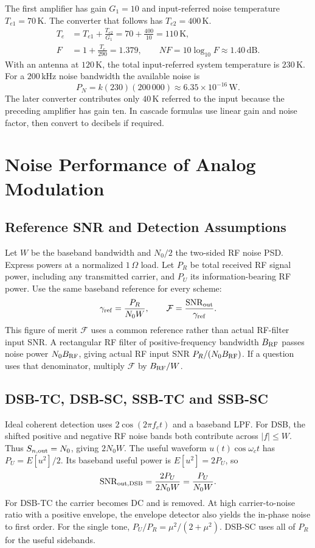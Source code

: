 \documentclass[12pt,a4paper]{article}
\begin{document}
\begin{tcolorbox}[examplebox, title={Calculate a Two-Stage Receiver Noise Temperature}]
The first amplifier has gain $G_1=10$ and input-referred noise temperature $T_{e1}=70\,\mathrm K$. The converter that follows has $T_{e2}=400\,\mathrm K$.
\[
\begin{aligned}
 T_e &= T_{e1}+\frac{T_{e2}}{G_1}
      =70+\frac{400}{10}=110\,\mathrm K,\\
 F&=1+\frac{T_e}{290}=1.379,\qquad
 NF=10\log_{10}F\approx1.40\,\mathrm{dB}.
\end{aligned}
\]
With an antenna at $120\,\mathrm K$, the total input-referred system temperature is $230\,\mathrm K$. For a $200\,\mathrm{kHz}$ noise bandwidth the available noise is
\[
 P_N=k(230)(200\,000)\approx6.35\times10^{-16}\,\mathrm W.
\]
The later converter contributes only $40\,\mathrm K$ referred to the input because the preceding amplifier has gain ten. In cascade formulas use linear gain and noise factor, then convert to decibels if required.
\end{tcolorbox}

\section{Noise Performance of Analog Modulation}
\subsection{Reference SNR and Detection Assumptions}
Let $W$ be the baseband bandwidth and $N_0/2$ the two-sided RF noise PSD. Express powers at a normalized $1\,\Omega$ load. Let $P_R$ be total received RF signal power, including any transmitted carrier, and $P_U$ its information-bearing RF power. Use the same baseband reference for every scheme:
\[
 \gamma_{\rm ref}=\frac{P_R}{N_0W},\qquad
 \mathcal F=\frac{\mathrm{SNR}_{\rm out}}{\gamma_{\rm ref}}.
\]
This figure of merit $\mathcal F$ uses a common reference rather than actual RF-filter input SNR. A rectangular RF filter of positive-frequency bandwidth $B_{\rm RF}$ passes noise power $N_0B_{\rm RF}$, giving actual RF input SNR $P_R/(N_0B_{\rm RF})$. If a question uses that denominator, multiply $\mathcal F$ by $B_{\rm RF}/W$.

\subsection{DSB-TC, DSB-SC, SSB-TC and SSB-SC}
Ideal coherent detection uses $2\cos(2\pi f_ct)$ and a baseband LPF. For DSB, the shifted positive and negative RF noise bands both contribute across $|f|\le W$. Thus $S_{n,\rm out}=N_0$, giving $2N_0W$. The useful waveform $u(t)\cos\omega_ct$ has $P_U=E[u^2]/2$. Its baseband useful power is $E[u^2]=2P_U$, so
\[
 \mathrm{SNR}_{\rm out,DSB}=\frac{2P_U}{2N_0W}=\frac{P_U}{N_0W}.
\]
For DSB-TC the carrier becomes DC and is removed. At high carrier-to-noise ratio with a positive envelope, the envelope detector also yields the in-phase noise to first order. For the single tone, $P_U/P_R=\mu^2/(2+\mu^2)$. DSB-SC uses all of $P_R$ for the useful sidebands.
\end{document}
